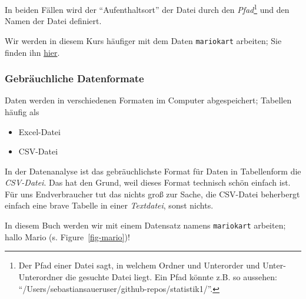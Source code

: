 \documentclass[
  letterpaper,
  DIV=11,
  numbers=noendperiod]{scrartcl}
\providecommand{\tightlist}{%
  \setlength{\itemsep}{0pt}\setlength{\parskip}{0pt}}\usepackage{longtable,booktabs,array}
\theoremstyle{definition}
\theoremstyle{definition}
\theoremstyle{definition}
\theoremstyle{remark}
\begin{document}
In beiden Fällen wird der ``Aufenthaltsort'' der Datei durch den
\emph{Pfad}\footnote{Der Pfad einer Datei sagt, in welchem Ordner und
  Unterorder und Unter-Unterordner die gesuchte Datei liegt. Ein Pfad
  könnte z.B. so aussehen:
  ``/Users/sebastiansaueruser/github-repos/statistik1/''.} und den Namen
der Datei definiert.

\begin{tcolorbox}[enhanced jigsaw, coltitle=black, colframe=quarto-callout-note-color-frame, opacityback=0, toprule=.15mm, opacitybacktitle=0.6, arc=.35mm, titlerule=0mm, toptitle=1mm, title=\textcolor{quarto-callout-note-color}{\faInfo}\hspace{0.5em}{Note}, bottomtitle=1mm, leftrule=.75mm, breakable, rightrule=.15mm, colbacktitle=quarto-callout-note-color!10!white, bottomrule=.15mm, colback=white, left=2mm]

Wir werden in diesem Kurs häufiger mit dem Daten \texttt{mariokart}
arbeiten; Sie finden ihn
\href{https://vincentarelbundock.github.io/Rdatasets/csv/openintro/mariokart.csv}{hier}.\footnotemark{}

\end{tcolorbox}


\subsubsection{Gebräuchliche
Datenformate}\label{gebruxe4uchliche-datenformate}

Daten werden in verschiedenen Formaten im Computer abgespeichert;
Tabellen häufig als

\begin{itemize}
\tightlist
\item
  Excel-Datei
\item
  CSV-Datei
\end{itemize}

In der Datenanalyse ist das gebräuchlichste Format für Daten in
Tabellenform die \emph{CSV-Datei}. Das hat den Grund, weil dieses Format
technisch schön einfach ist. Für uns Endverbraucher tut das nichts groß
zur Sache, die CSV-Datei beherbergt einfach eine brave Tabelle in einer
\emph{Textdatei}, sonst nichts.

In diesem Buch werden wir mit einem Datensatz namens \texttt{mariokart}
arbeiten; hallo Mario (s. Figure~\ref{fig-mario})!
\end{document}
